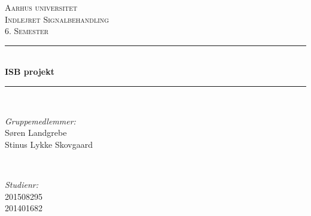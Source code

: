 \documentclass[12pt]{article}
\begin{document}
	
	\begin{titlepage}
		
		
		
		\newcommand{\HRule}{\rule{\linewidth}{0.5mm}} %
		\setlength{\topmargin}{0in}
		\centering %
		
		\textsc{\LARGE Aarhus universitet}\\[1.5cm] %
		\textsc{\Large Indlejret Signalbehandling}\\[0.5cm] %
		\textsc{\large 6. Semester}\\[0.5cm] %
		
		
		\HRule \\[0.4cm]
		{ \huge \bfseries ISB projekt}\\ %
		\HRule \\[1cm]
		
		
		\begin{minipage}{0.4\textwidth}
			\begin{flushleft} \large
				\emph{Gruppemedlemmer:}\\
				Søren Landgrebe \\
				Stinus Lykke Skovgaard \\
			\end{flushleft}
		\end{minipage}
		~
		\begin{minipage}{0.4\textwidth}
			\begin{flushright} \large
				\emph{Studienr:} \\
				201508295\\
				201401682\
			\end{flushright}
		\end{minipage}\\[5cm]
		

\end{titlepage}
\end{document}
